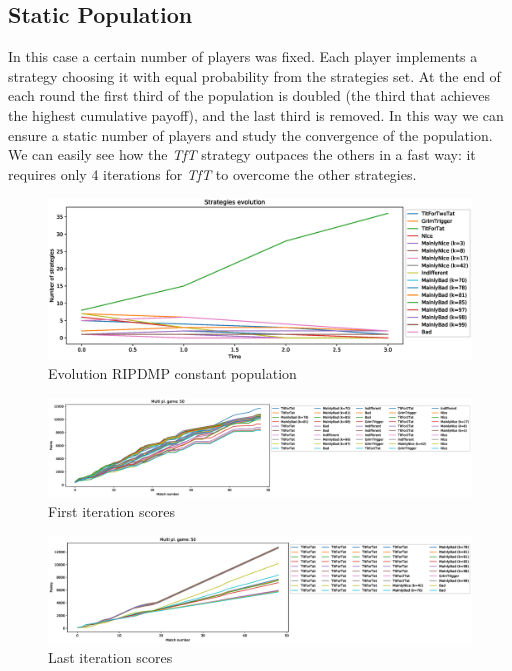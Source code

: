 \documentclass[journal,a4paper,10pt,twoside]{IEEEtran} %
\begin{document}
\subsection{Static Population}
In this case a certain number of players was fixed. Each player implements a strategy choosing it with equal probability from the strategies set. At the end of each round the first third of the population is doubled (the third that achieves the highest cumulative payoff), and the last third is removed. In this way we can ensure a static number of players and study the convergence of the population.
We can easily see how the \textit{TfT} strategy outpaces the others in a fast way: it requires only $4$ iterations for \textit{TfT} to overcome the other strategies.

\begin{figure}[!ht]
    \centering
    \includegraphics[width=1\columnwidth]{../img/ripdmp-const/ripdmp-evolution-const-pop-50}
    \caption{Evolution RIPDMP constant population}
    \label{fig:constR}
\end{figure}

\begin{figure}[!ht]
    \centering
    \includegraphics[width=1\columnwidth]{../img/ripdmp-const/ripdmp-scores-const-pop-50-r0}
    \caption{First iteration scores}
    \label{fig:constFI}
\end{figure}

\begin{figure}[!ht]
    \centering
    \includegraphics[width=1\columnwidth]{../img/ripdmp-const/ripdmp-scores-const-pop-50-r3}
    \caption{Last iteration scores}
    \label{fig:constLI}
\end{figure}
\end{document}
